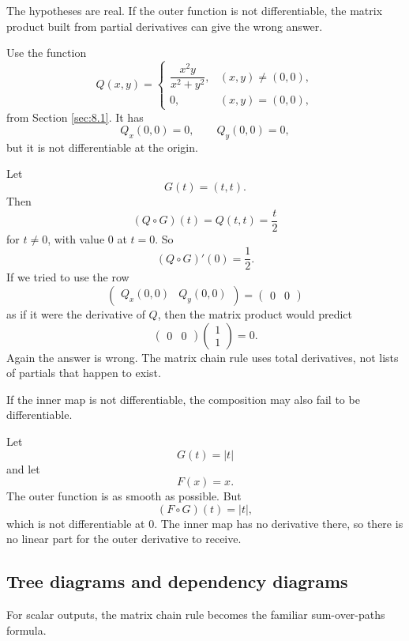 The hypotheses are real.  If the outer function is not differentiable, the matrix product
built from partial derivatives can give the wrong answer.

\begin{example}
Use the function
\[
    Q(x,y)=
    \begin{cases}
    \dfrac{x^2y}{x^2+y^2}, & (x,y)\ne(0,0),\\[2mm]
    0, & (x,y)=(0,0),
    \end{cases}
\]
from Section \ref{sec:8.1}.  It has
\[
    Q_x(0,0)=0,
    \qquad
    Q_y(0,0)=0,
\]
but it is not differentiable at the origin.

Let
\[
    G(t)=(t,t).
\]
Then
\[
    (Q\circ G)(t)=Q(t,t)=\frac{t}{2}
\]
for \(t\ne0\), with value \(0\) at \(t=0\).  So
\[
    (Q\circ G)'(0)=\frac12.
\]
If we tried to use the row
\[
    \begin{pmatrix}Q_x(0,0)&Q_y(0,0)\end{pmatrix}
    =
    \begin{pmatrix}0&0\end{pmatrix}
\]
as if it were the derivative of \(Q\), then the matrix product would predict
\[
    \begin{pmatrix}0&0\end{pmatrix}
    \begin{pmatrix}1\\1\end{pmatrix}
    =
    0.
\]
Again the answer is wrong.  The matrix chain rule uses total derivatives, not lists of
partials that happen to exist.
\end{example}

If the inner map is not differentiable, the composition may also fail to be differentiable.

\begin{example}
Let
\[
    G(t)=|t|
\]
and let
\[
    F(x)=x.
\]
The outer function is as smooth as possible.  But
\[
    (F\circ G)(t)=|t|,
\]
which is not differentiable at \(0\).  The inner map has no derivative there, so there is
no linear part for the outer derivative to receive.
\end{example}

\subsection{Tree diagrams and dependency diagrams}

For scalar outputs, the matrix chain rule becomes the familiar sum-over-paths formula.

